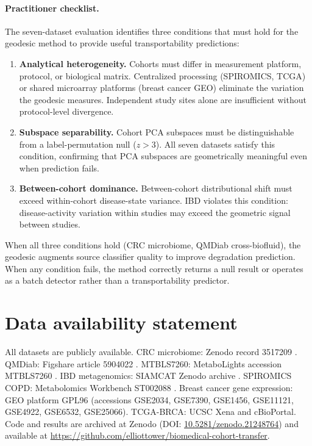 \documentclass[11pt]{article}
\begin{document}
\paragraph{Practitioner checklist.} The seven-dataset evaluation identifies three conditions that must hold for the geodesic method to provide useful transportability predictions:
\begin{enumerate}
\item \textbf{Analytical heterogeneity.} Cohorts must differ in measurement platform, protocol, or biological matrix. Centralized processing (SPIROMICS, TCGA) or shared microarray platforms (breast cancer GEO) eliminate the variation the geodesic measures. Independent study sites alone are insufficient without protocol-level divergence.
\item \textbf{Subspace separability.} Cohort PCA subspaces must be distinguishable from a label-permutation null ($z > 3$). All seven datasets satisfy this condition, confirming that PCA subspaces are geometrically meaningful even when prediction fails.
\item \textbf{Between-cohort dominance.} Between-cohort distributional shift must exceed within-cohort disease-state variance. IBD violates this condition: disease-activity variation within studies may exceed the geometric signal between studies.
\end{enumerate}
When all three conditions hold (CRC microbiome, QMDiab cross-biofluid), the geodesic augments source classifier quality to improve degradation prediction. When any condition fails, the method correctly returns a null result or operates as a batch detector rather than a transportability predictor.

\section*{Data availability statement}

All datasets are publicly available. CRC microbiome: Zenodo record 3517209 \citep{wirbel2019meta}. QMDiab: Figshare article 5904022 \citep{yousri2015metabolic}. MTBLS7260: MetaboLights accession MTBLS7260 \citep{leonletelier2024contributions}. IBD metagenomics: SIAMCAT Zenodo archive \citep{wirbel2021siamcat}. SPIROMICS COPD: Metabolomics Workbench ST002088 \citep{bowler2017spiromics}. Breast cancer gene expression: GEO platform GPL96 (accessions GSE2034, GSE7390, GSE1456, GSE11121, GSE4922, GSE6532, GSE25066). TCGA-BRCA: UCSC Xena and cBioPortal. Code and results are archived at Zenodo (DOI: \href{https://doi.org/10.5281/zenodo.21248764}{10.5281/zenodo.21248764}) and available at \url{https://github.com/elliottower/biomedical-cohort-transfer}.
\end{document}
